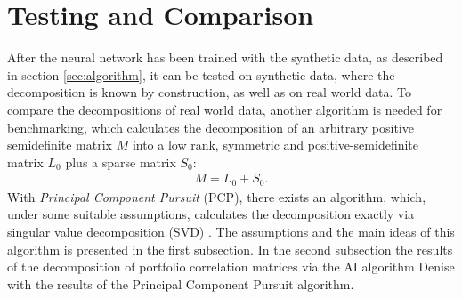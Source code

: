 \newpage
\section{Testing and Comparison}\label{sec:comparison}
After the neural network has been trained with the synthetic data, as described in section \ref{sec:algorithm}, it can be tested on synthetic data, where the decomposition is known by construction, as well as on real world data. To compare the decompositions of real world data, another algorithm is needed for benchmarking, which calculates the decomposition of an arbitrary positive semidefinite matrix $M$ into a low rank, symmetric and positive-semidefinite matrix $L_0$ plus a sparse matrix $S_0$:
\begin{align}
 M = L_0 + S_0.
\end{align}
With \textit{Principal  Component  Pursuit} (PCP), there exists an algorithm, which, under some suitable assumptions, calculates the decomposition exactly via singular value decomposition (SVD) \cite{candes2009robust}. The assumptions and the main ideas of this algorithm is presented in the first subsection. In the second subsection the results of the decomposition of portfolio correlation matrices via the AI algorithm Denise with the results of the Principal Component  Pursuit algorithm.

